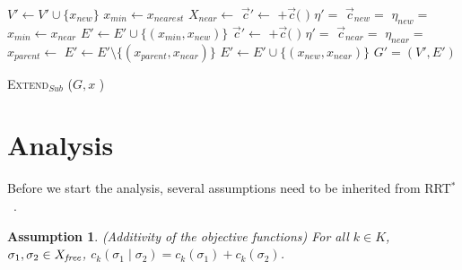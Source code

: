 \documentclass[conference]{IEEEtran}
\newtheorem{asmp}{Assumption}
\begin{document}
\begin{algorithm}
\begin{algorithmic}[1]
\State $ V' \leftarrow V' \cup \{ x_{new} \} $
\State $ x_{min} \leftarrow x_{nearest} $
\State $ X_{near} \leftarrow $ 
			\State $ \vec{c}' \leftarrow $  $ + \vec{c}( $  $ ) $ 
			\State $ \eta' =  $ 
			\State $ \vec{c}_{new} = $  
			\State $ \eta_{new} = $ 
				\State $ x_{min} \leftarrow x_{near} $
			\EndIf
		\EndIf
	\EndFor
	\State $ E' \leftarrow E' \cup \{ ( x_{min}, x_{new} ) \} $
\EndIf
{}
		\State $ \vec{c}' \leftarrow $  $ + \vec{c}( $  $ ) $ 
		\State $ \eta' =  $ 
		\State $ \vec{c}_{near} = $  
		\State $ \eta_{near} = $ 
			\State $ x_{parent} \leftarrow $ 
			\State $ E' \leftarrow E' \setminus \{ ( x_{parent}, x_{near} ) \} $
			\State $ E' \leftarrow E' \cup \{ ( x_{new}, x_{near} ) \} $
		\EndIf
	\EndIf
\EndFor
\Return $ G' = (V', E') $ 
\end{algorithmic}
\label{alg:morrtstar:extend:sub}
\caption{ \textsc{Extend}$_{Sub} $ ($ G, x$ ) }
\end{algorithm} 


\section{Analysis}
\label{sec:theoretic_analysis}

Before we start the analysis, several assumptions need to be inherited from  RRT$^{*}$~\cite{Karaman.Frazzoli:RSS10}.
\begin{asmp}{(Additivity of the objective functions)}
\label{asmp:additivity}	
For all $ k \in K $, $ \sigma_{1} , \sigma_{2} \in X_{\it free} $,
$ c_{k} ( \sigma_{1}  \mid \sigma_{2} ) = c_{k} ( \sigma_{1} ) + c_{k} ( \sigma_{2} ) $.
\end{asmp}
\end{document}
